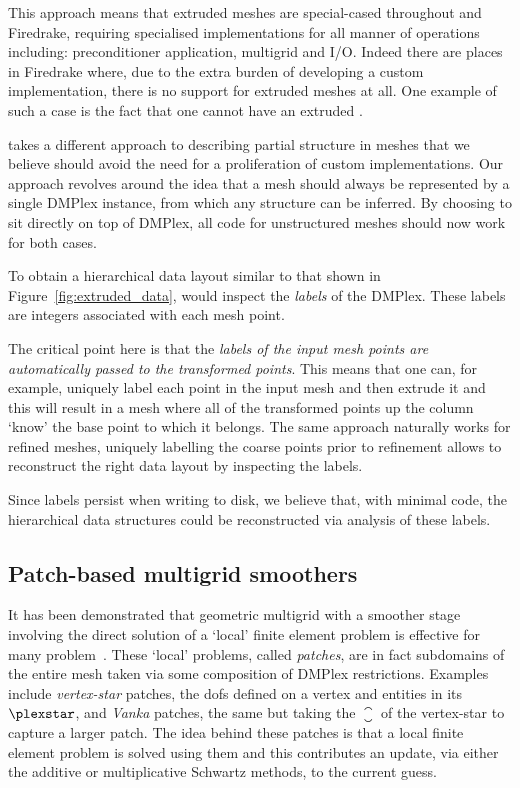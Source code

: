 This approach means that extruded meshes are special-cased throughout  and Firedrake, requiring specialised implementations for all manner of operations including: preconditioner application, multigrid and I/O.
Indeed there are places in Firedrake where, due to the extra burden of developing a custom implementation, there is no support for extruded meshes at all.
One example of such a case is the fact that one cannot have an extruded .

 takes a different approach to describing partial structure in meshes that we believe should avoid the need for a proliferation of custom implementations.
Our approach revolves around the idea that a mesh should always be represented by a single DMPlex instance, from which any structure can be inferred.
By choosing to sit directly on top of DMPlex, all code for unstructured meshes should now work for both cases.

To obtain a hierarchical data layout similar to that shown in Figure~\ref{fig:extruded_data},  would inspect the \textit{labels} of the DMPlex.
These labels are integers associated with each mesh point.

The critical point here is that the \textit{labels of the input mesh points are automatically passed to the transformed points}.
This means that one can, for example, uniquely label each point in the input mesh and then extrude it and this will result in a mesh where all of the transformed points up the column `know' the base point to which it belongs.
The same approach naturally works for refined meshes, uniquely labelling the coarse points prior to refinement allows  to reconstruct the right data layout by inspecting the labels.

Since labels persist when writing to disk, we believe that, with minimal code, the hierarchical data structures could be reconstructed via analysis of these labels.

\subsection{Patch-based multigrid smoothers}
\label{sec:future_patch}

It has been demonstrated that geometric multigrid with a smoother stage involving the direct solution of a `local' finite element problem is effective for many problem~\cite{vankaBlockimplicitMultigridSolution1986,arnoldPRECONDITIONINGDivAPPLICATIONS1997,farrellAugmentedLagrangianPreconditioner2019}.
These `local' problems, called \textit{patches}, are in fact subdomains of the entire mesh taken via some composition of DMPlex restrictions.
Examples include \textit{vertex-star} patches, the \glspl{dof} defined on a vertex and entities in its $\plexstar$, and \textit{Vanka} patches, the same but taking the $\closure$ of the vertex-star to capture a larger patch.
The idea behind these patches is that a local finite element problem is solved using them and this contributes an update, via either the additive or multiplicative Schwartz methods, to the current guess.

